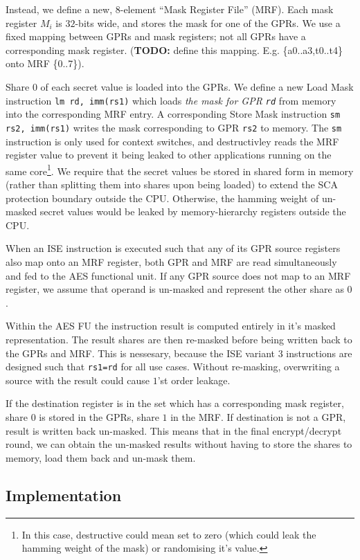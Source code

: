 Instead, we define a new, $8$-element ``Mask Register File'' (MRF).
Each mask register $M_i$ is $32$-bits wide, and stores the mask for
one of the GPRs.
We use a fixed mapping between GPRs and mask registers;
not all GPRs have a corresponding mask register.
({\bf TODO:} define this mapping. E.g. \{a0..a3,t0..t4\} onto MRF \{0..7\}).

Share $0$ of each secret value is loaded into the GPRs.
We define a new Load Mask instruction {\tt lm rd, imm(rs1)} which
loads {\em the mask for GPR {\tt rd}} from memory into the corresponding
MRF entry.
A corresponding Store Mask instruction {\tt sm rs2, imm(rs1)} writes
the mask corresponding to GPR {\tt rs2} to memory.
The {\tt sm} instruction is only used for context switches, and
destructivley reads the MRF register value to prevent it being
leaked to other applications running on the same core\footnote{
    In this case, destructive could mean set to zero (which could
    leak the hamming weight of the mask) or randomising it's value.}.
We require that the secret values be stored in shared form in memory
(rather than splitting them into shares upon being loaded)
to extend the SCA protection boundary outside the CPU.
Otherwise, the hamming weight of un-masked secret values would be
leaked by memory-hierarchy registers outside the CPU.

When an ISE instruction is executed such that any of its GPR source
registers also map onto an MRF register, both GPR and MRF are
read simultaneously and fed to the AES functional unit.
If any GPR source does not map to an MRF register, we assume that
operand is un-masked and represent the other share as $0$.

Within the AES FU the instruction result is computed entirely in it's
masked representation.
The result shares are then re-masked before being written back to the
GPRs and MRF.
This is nessesary, because the ISE variant $3$ instructions are designed
such that {\tt rs1=rd} for all use cases.
Without re-masking, overwriting a source with the result could cause 
$1$'st order leakage.

If the destination register is in the set which has a corresponding
mask register, share $0$ is stored in the GPRs, share $1$ in the MRF.
If destination is not a GPR, result is written back un-masked.
This means that in the final encrypt/decrypt round, we can obtain
the un-masked results without having to store the shares to memory,
load them back and un-mask them.

\subsection{Implementation}

